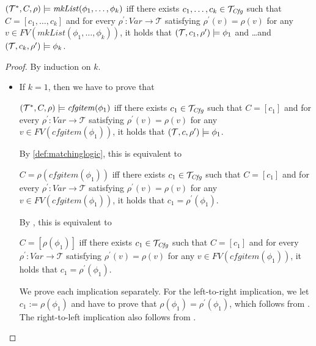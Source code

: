 \begin{lemma}\label{lem:mkListSemantics}
$(\mathcal{T}^*, C, \rho) \models \mathit{mkList}(\phi_1,\ldots,\phi_k)$
iff there exists $c_1, \ldots, c_k \in \mathcal{T}_{\mathit{Cfg}}$ such that $C = [c_1, \ldots, c_k]$ and for every $\rho^\prime : \mathit{Var} \to \mathcal{T}$ satisfying
$\rho^\prime(v) = \rho(v)$ for any \\
$v \in \mathit{FV}(\mathit{mkList}(\phi_1, \ldots, \phi_k))$,
it holds that 
$(\mathcal{T}, c_1, \rho^\prime) \models \phi_1$ and \ldots and $(\mathcal{T}, c_k, \rho^\prime) \models \phi_k$.
\end{lemma}
\begin{proof}
By induction on $k$.
\begin{itemize}
    \item If $k = 1$, then we have to prove that
    \begin{proofenv}
    $(\mathcal{T}^*, C, \rho) \models \mathit{cfgitem}(\phi_1)$
    iff there exists $c_1 \in \mathcal{T}_{\mathit{Cfg}}$ such that $C = [c_1]$ and for every $\rho^\prime : \mathit{Var} \to \mathcal{T}$ satisfying
    $\rho^\prime(v) = \rho(v)$ for any $v \in \mathit{FV}(\mathit{cfgitem}(\phi_1))$, it holds that
    $(\mathcal{T}, c, \rho^\prime) \models \phi_1$.
    \end{proofenv}
    By \cref{def:matchinglogic}, this is equivalent to
    \begin{proofenv}
    $C = \rho(\mathit{cfgitem}(\phi_1))$
    iff there exists $c_1 \in \mathcal{T}_{\mathit{Cfg}}$ such that $C = [c_1]$ and for every $\rho^\prime : \mathit{Var} \to \mathcal{T}$ satisfying
    $\rho^\prime(v) = \rho(v)$ for any $v \in \mathit{FV}(\mathit{cfgitem}(\phi_1))$, it holds that
    $c_1 = \rho^\prime(\phi_1)$.
    \end{proofenv}
    By , this is equivalent to
    \begin{proofenv}
    $C = [\rho(\phi_1)]$
    iff there exists $c_1 \in \mathcal{T}_{\mathit{Cfg}}$ such that $C = [c_1]$ and for every $\rho^\prime : \mathit{Var} \to \mathcal{T}$ satisfying
    $\rho^\prime(v) = \rho(v)$ for any $v \in \mathit{FV}(\mathit{cfgitem}(\phi_1))$, it holds that
    $c_1 = \rho^\prime(\phi_1)$.
    \end{proofenv}
    We prove each implication separately.
    For the left-to-right implication, we let $c_1 := \rho(\phi_1)$
    and have to prove that $\rho(\phi_1) = \rho^\prime(\phi_1)$, which follows from .
    The right-to-left implication also follows from  .
    

\end{itemize}
\end{proof}
